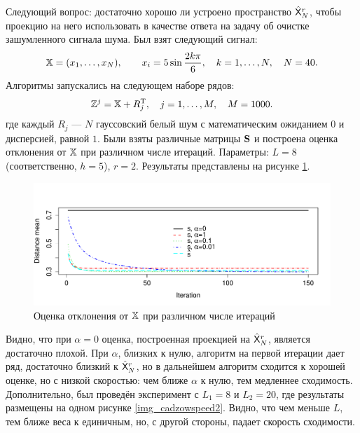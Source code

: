 \documentclass[12pt,a4paper,fleqn,leqno]{article}
\begin{document}
Следующий вопрос: достаточно хорошо ли устроено пространство $\hat {\mathsf{X}}_N^r$, чтобы проекцию на него использовать в качестве ответа на задачу об очистке зашумленного сигнала шума. Был взят следующий сигнал:
\begin{equation*}
\mathbb{X} = (x_{1}, \ldots, x_N), \qquad x_{i} = 5\sin{\frac{2 k \pi}{6}}, \quad k = 1, \ldots, N, \quad N = 40.
\end{equation*}
Алгоритмы запускались на следующем наборе рядов:
\begin{equation*}
\mathbb{Z}^j = \mathbb{X} + R_j^{\mathrm{T}}, \quad j = 1, \ldots, M, \quad M = 1000.
\end{equation*}
где каждый $R_j$ --- $N$ гауссовский белый шум с математическим ожиданием $0$ и дисперсией, равной $1$. Были взяты различные матрицы $\mathbf{S}$ и построена оценка отклонения от $\mathbb{X}$ при различном числе итераций. Параметры: $L = 8$ (соответственно, $h = 5$), $r = 2$. Результаты представлены на рисунке \ref{img_cadzowspeed}.
\begin{figure}[!h] \begin{center}
\includegraphics[width = 15cm]{cadzowspeed.pdf}\caption{Оценка отклонения от $\mathbb{X}$ при различном числе итераций}\label{img_cadzowspeed}
\end{center}\end{figure}

Видно, что при $\alpha = 0$ оценка, построенная проекцией на $\hat {\mathsf{X}}_N^r$, является достаточно плохой. При $\alpha$, близких к нулю, алгоритм на первой итерации дает ряд, достаточно близкий к $\hat {\mathsf{X}}_N^r$, но в дальнейшем алгоритм сходится к хорошей оценке, но с низкой скоростью: чем ближе $\alpha$ к нулю, тем медленнее сходимость. Дополнительно, был проведён эксперимент с $L_1 = 8$ и $L_2 = 20$, где результаты размещены на одном рисунке \ref{img_cadzowspeed2}. Видно, что чем меньше $L$, тем ближе веса к единичным, но, с другой стороны, падает скорость сходимости.
\end{document}
